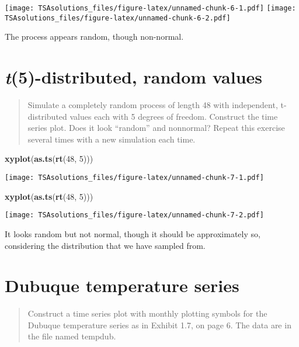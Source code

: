 \documentclass[]{book}
\newenvironment{Shaded}{\begin{snugshade}}{\end{snugshade}}
\newcommand{\KeywordTok}[1]{\textcolor[rgb]{0.13,0.29,0.53}{\textbf{{#1}}}}
\newcommand{\DecValTok}[1]{\textcolor[rgb]{0.00,0.00,0.81}{{#1}}}
\newcommand{\NormalTok}[1]{{#1}}
\theoremstyle{definition}
\theoremstyle{definition}
\theoremstyle{remark}
\begin{document}
\texttt{[image: TSAsolutions\_files/figure-latex/unnamed-chunk-6-1.pdf]}
\texttt{[image: TSAsolutions\_files/figure-latex/unnamed-chunk-6-2.pdf]}

The process appears random, though non-normal.

\section{\texorpdfstring{\emph{t}(5)-distributed, random
values}{t(5)-distributed, random values}}\label{t5-distributed-random-values}

\begin{quote}
Simulate a completely random process of length 48 with independent,
t-distributed values each with 5 degrees of freedom. Construct the time
series plot. Does it look ``random'' and nonnormal? Repeat this exercise
several times with a new simulation each time.
\end{quote}

\begin{Shaded}
\begin{Highlighting}[]
\KeywordTok{xyplot}\NormalTok{(}\KeywordTok{as.ts}\NormalTok{(}\KeywordTok{rt}\NormalTok{(}\DecValTok{48}\NormalTok{, }\DecValTok{5}\NormalTok{)))}
\end{Highlighting}
\end{Shaded}

\texttt{[image: TSAsolutions\_files/figure-latex/unnamed-chunk-7-1.pdf]}

\begin{Shaded}
\begin{Highlighting}[]
\KeywordTok{xyplot}\NormalTok{(}\KeywordTok{as.ts}\NormalTok{(}\KeywordTok{rt}\NormalTok{(}\DecValTok{48}\NormalTok{, }\DecValTok{5}\NormalTok{)))}
\end{Highlighting}
\end{Shaded}

\texttt{[image: TSAsolutions\_files/figure-latex/unnamed-chunk-7-2.pdf]}

It looks random but not normal, though it should be approximately so,
considering the distribution that we have sampled from.

\section{Dubuque temperature series}\label{dubuque-temperature-series}

\begin{quote}
Construct a time series plot with monthly plotting symbols for the
Dubuque temperature series as in Exhibit 1.7, on page 6. The data are in
the file named tempdub.
\end{quote}
\end{document}
